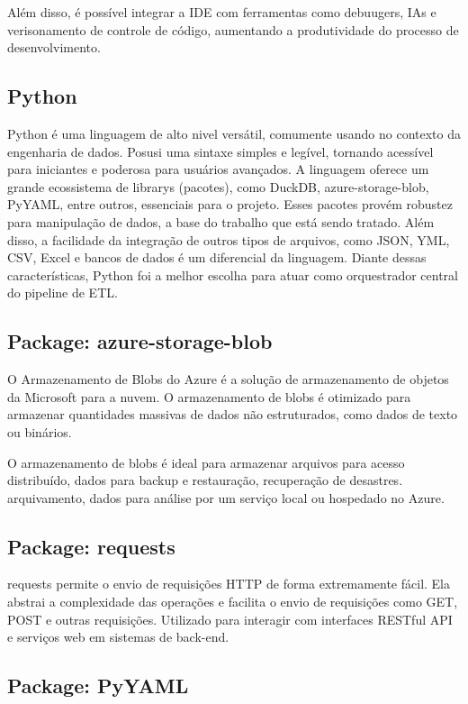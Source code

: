 Além disso, é possível integrar a IDE com ferramentas como debuugers, IAs e verisonamento de controle de código, aumentando a produtividade do processo de desenvolvimento.

\subsection{Python}

Python é uma linguagem de alto nivel versátil, comumente usando no contexto da engenharia de dados. Posusi uma sintaxe simples e legível, tornando acessível para iniciantes e poderosa para usuários avançados. A linguagem oferece um grande ecossistema de librarys (pacotes), como DuckDB, azure-storage-blob, PyYAML, entre outros, essenciais para o projeto. Esses pacotes provém robustez para manipulação de dados, a base do trabalho que está sendo tratado. Além disso, a facilidade da integração de outros tipos de arquivos, como JSON, YML, CSV, Excel e bancos de dados é um diferencial da linguagem. Diante dessas características, Python foi a melhor escolha para atuar como orquestrador central do pipeline de ETL.\cite{python_about}

\subsection{Package: azure-storage-blob}

O Armazenamento de Blobs do Azure é a solução de armazenamento de objetos da Microsoft para a nuvem. O armazenamento de blobs é otimizado para armazenar quantidades massivas de dados não estruturados, como dados de texto ou binários.

O armazenamento de blobs é ideal para armazenar arquivos para acesso distribuído, dados para backup e restauração, recuperação de desastres. arquivamento, dados para análise por um serviço local ou hospedado no Azure.\cite{pypi_azureblob}

\subsection{Package: requests}

requests permite o envio de requisições HTTP de forma extremamente fácil. Ela abstrai a complexidade das operações e facilita o envio de requisições como GET, POST e outras requisições. Utilizado para interagir com interfaces RESTful API e serviços web em sistemas de back-end.\cite{requests_docs}

\subsection{Package: PyYAML}

